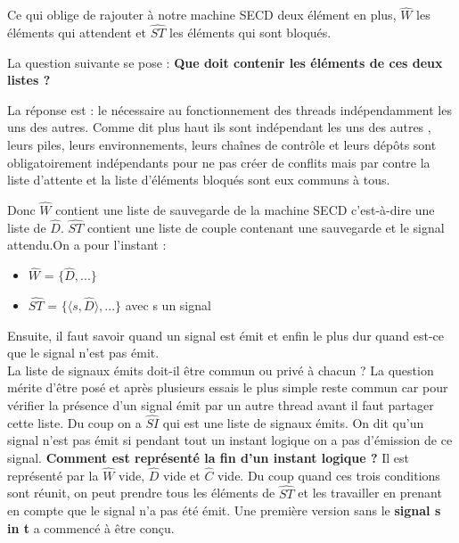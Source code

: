 \documentclass[10pt,a4paper]{article}
\begin{document}
			
			Ce qui oblige de rajouter à notre machine SECD deux élément en plus, $\widehat{W}$ les éléments qui attendent et $\widehat{ST}$ les éléments qui sont bloqués.
			\bigbreak
			
			
			La question suivante se pose : \textbf{Que doit contenir les éléments de ces deux listes ?}
			\smallbreak
			
			La réponse est : le nécessaire au fonctionnement des threads indépendamment les uns des autres. Comme dit plus haut ils sont indépendant les uns des autres , leurs piles, leurs environnements, leurs chaînes de contrôle et leurs dépôts sont obligatoirement indépendants pour ne pas créer de conflits mais par contre la liste d'attente et la liste d'éléments bloqués sont eux communs à tous.
			\medbreak
			
			Donc $\widehat{W}$ contient une liste de sauvegarde de la machine SECD c'est-à-dire une liste de $\widehat{D}$. $\widehat{ST}$ contient une liste de couple contenant une sauvegarde et le signal attendu.On a pour l'instant :
			
			\begin{itemize}
				\item[] $\widehat{W}$ = $\{\widehat{D},...\}$
				\item[] $\widehat{ST}$ = $\{\langle s,\widehat{D}\rangle,...\}$ avec s un signal 
			\end{itemize}
		
			Ensuite, il faut savoir quand un signal est émit et enfin le plus dur quand est-ce que le signal n'est pas émit.
			\\
			La liste de signaux émits doit-il être commun ou privé à chacun ? La question mérite d'être posé et après plusieurs essais le plus simple reste commun car pour vérifier la présence d'un signal émit par un autre thread avant il faut partager cette liste. Du coup on a $\widehat{SI}$ qui est une liste de signaux émits.
			\smallbreak
			On dit qu'un signal n'est pas émit si pendant tout un instant logique on a pas d'émission de ce signal. \textbf{Comment est représenté la fin d'un instant logique ?} Il est représenté par la $\widehat{W}$ vide, $\widehat{D}$ vide et $\widehat{C}$ vide. 
			\smallbreak
			Du coup quand ces trois conditions sont réunit, on peut prendre tous les éléments de $\widehat{ST}$ et les travailler en prenant en compte que le signal n'a pas été émit.
			\smallbreak
			Une première version sans le \textbf{signal s in t} a commencé à être conçu.
			\newpage
			
			
\end{document}
